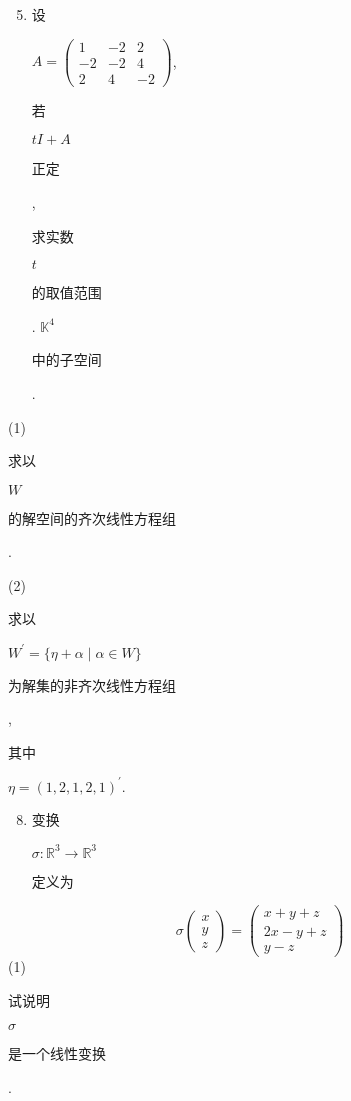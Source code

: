 \documentclass[10pt]{article}
\begin{document}
\begin{enumerate}
  \setcounter{enumi}{4}
  \item \begin{CJK}{UTF8}{mj}设\end{CJK} $A=\left(\begin{array}{ccc}1 & -2 & 2 \\ -2 & -2 & 4 \\ 2 & 4 & -2\end{array}\right)$, \begin{CJK}{UTF8}{mj}若\end{CJK} $t I+A$ \begin{CJK}{UTF8}{mj}正定\end{CJK}, \begin{CJK}{UTF8}{mj}求实数\end{CJK} $t$ \begin{CJK}{UTF8}{mj}的取值范围\end{CJK}. $\mathbb{K}^{4}$ \begin{CJK}{UTF8}{mj}中的子空间\end{CJK}.
\end{enumerate}
(1) \begin{CJK}{UTF8}{mj}求以\end{CJK} $W$ \begin{CJK}{UTF8}{mj}的解空间的齐次线性方程组\end{CJK}.

(2) \begin{CJK}{UTF8}{mj}求以\end{CJK} $W^{\prime}=\{\eta+\alpha \mid \alpha \in W\}$ \begin{CJK}{UTF8}{mj}为解集的非齐次线性方程组\end{CJK}, \begin{CJK}{UTF8}{mj}其中\end{CJK} $\eta=(1,2,1,2,1)^{\prime}$.

\begin{enumerate}
  \setcounter{enumi}{7}
  \item \begin{CJK}{UTF8}{mj}变换\end{CJK} $\sigma: \mathbb{R}^{3} \rightarrow \mathbb{R}^{3}$ \begin{CJK}{UTF8}{mj}定义为\end{CJK}
\end{enumerate}
$$
\sigma\left(\begin{array}{l}
x \\
y \\
z
\end{array}\right)=\left(\begin{array}{c}
x+y+z \\
2 x-y+z \\
y-z
\end{array}\right)
$$
(1) \begin{CJK}{UTF8}{mj}试说明\end{CJK} $\sigma$ \begin{CJK}{UTF8}{mj}是一个线性变换\end{CJK}.
\end{document}

